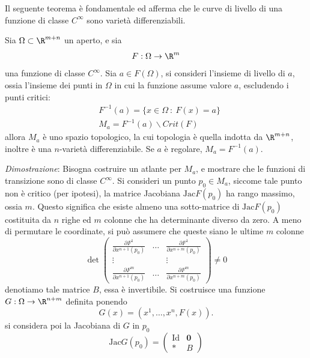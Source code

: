 \documentclass[10pt, letterpaper]{report}
\begin{document}
Il seguente teorema è fondamentale ed afferma che le curve di livello di una funzione di classe $C^\infty$ sono varietà differenziabili.
\begin{teorema}
    Sia $\Omega\subset\R^{m+n}$ un aperto, e sia \begin{equation}
        F:\Omega\rightarrow\R^m
    \end{equation} una funzione di classe $C^\infty$. Sia $a\in F(\Omega)$, si consideri l'insieme di livello di $a$, ossia l'insieme dei punti in $\Omega$ in cui la funzione assume valore $a$, escludendo i punti critici:\begin{align}
       &F^{-1}(a)=\{x\in\Omega \ : \ F(x)=a\}\\
        & M_a=F^{-1}(a)\backslash Crit(F)
    \end{align}
    allora $M_a$ è uno spazio topologico, la cui topologia è quella indotta da $\R^{m+n}$, inoltre è una $n$-varietà differenziabile. Se $a$ è regolare, $M_a=F^{-1}(a)$.
\end{teorema}
\textit{Dimostrazione}: Bisogna costruire un atlante per $M_a$, e mostrare che le funzioni di transizione sono di classe $C^\infty$. Si consideri un punto $p_0\in M_a$, siccome tale punto non è critico (per ipotesi), la matrice Jacobiana $\text{Jac}F(p_0)$ ha rango massimo, ossia $m$. Questo significa che esiste almeno una sotto-matrice di $\text{Jac}F(p_0)$ costituita da $n$ righe ed $m$ colonne che ha determinante diverso da zero. A meno di permutare le coordinate, si può assumere che queste siano le ultime $m$ colonne\begin{equation}\label{eq:jacobiana_G}
    \det\begin{pmatrix}
        \frac{\partial F^1}{\partial x^{n+1}(p_0)}&\dots& \frac{\partial F^1}{\partial x^{n+m}(p_0)}\\ 
        \vdots & & \vdots \\ 
        \frac{\partial F^m}{\partial x^{n+1}(p_0)}&\dots& \frac{\partial F^m}{\partial x^{n+m}(p_0)}
    \end{pmatrix}\ne 0
\end{equation}
denotiamo tale matrice $B$, essa è invertibile. Si costruisce una funzione $G:\Omega\rightarrow\R^{n+m}$ definita ponendo \begin{equation}
    G(x)=(x^1,\dots,x^n,F(x)).
\end{equation}
si considera poi la Jacobiana di $G$ in $p_0$\begin{equation}
    \text{Jac}G(p_0)=\begin{pmatrix}
        \text{Id}&\mathbf 0 \\ \mathbf * & B
    \end{pmatrix}
\end{equation}
\end{document}
